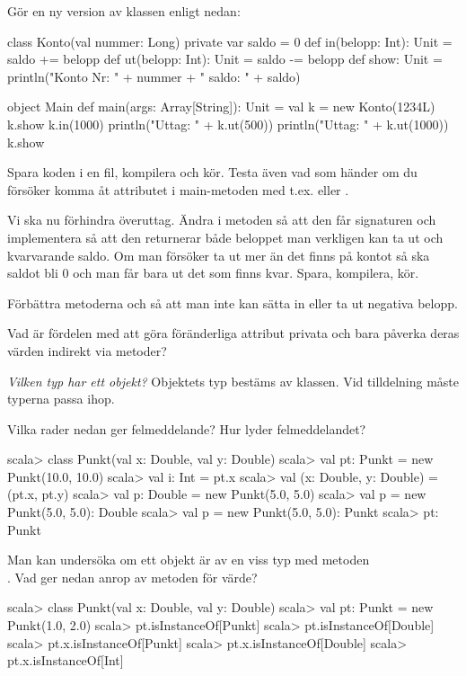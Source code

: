 \Subtask Gör en ny version av klassen  enligt nedan:

\begin{Code}
class Konto(val nummer: Long){ 
  private var saldo = 0
  def in(belopp: Int): Unit = {saldo += belopp}
  def ut(belopp: Int): Unit = {saldo -= belopp}
  def show: Unit = 
    println("Konto Nr: " + nummer + " saldo: " + saldo) 
}

object Main {
  def main(args: Array[String]): Unit = {
    val k = new Konto(1234L)
    k.show
    k.in(1000)
    println("Uttag: " + k.ut(500))
    println("Uttag: " + k.ut(1000))
    k.show
  }
}
\end{Code}

\Subtask Spara koden i en fil, kompilera och kör. Testa även vad som händer om du försöker komma åt attributet  i main-metoden med t.ex.  eller . 

\Subtask Vi ska nu förhindra överuttag. Ändra i metoden  så att den får signaturen  och implementera  så att den returnerar både beloppet man verkligen kan ta ut och kvarvarande saldo. Om man försöker ta ut mer än det finns på kontot så ska saldot bli 0 och man får bara ut det som finns kvar. Spara, kompilera, kör. 

\Subtask Förbättra metoderna  och  så att man inte kan sätta in eller ta ut negativa belopp.

\Subtask Vad är fördelen med att göra föränderliga attribut privata och bara påverka deras värden indirekt via metoder?

\Task \emph{Vilken typ har ett objekt?} Objektets typ bestäms av klassen. Vid tilldelning måste typerna passa ihop.

\Subtask Vilka rader nedan ger felmeddelande? Hur lyder felmeddelandet?
\begin{REPL}
scala> class Punkt(val x: Double, val y: Double)
scala> val pt: Punkt = new Punkt(10.0, 10.0)
scala> val i: Int = pt.x
scala> val (x: Double, y: Double) = (pt.x, pt.y)
scala> val p: Double = new Punkt(5.0, 5.0)
scala> val p = new Punkt(5.0, 5.0): Double
scala> val p = new Punkt(5.0, 5.0): Punkt
scala> pt: Punkt
\end{REPL}


\Subtask Man kan undersöka om ett objekt är av en viss typ med metoden \\ . Vad ger nedan anrop av metoden  för värde?
\begin{REPL}
scala> class Punkt(val x: Double, val y: Double)
scala> val pt: Punkt = new Punkt(1.0, 2.0)
scala> pt.isInstanceOf[Punkt]
scala> pt.isInstanceOf[Double]
scala> pt.x.isInstanceOf[Punkt]
scala> pt.x.isInstanceOf[Double]
scala> pt.x.isInstanceOf[Int]
\end{REPL}

